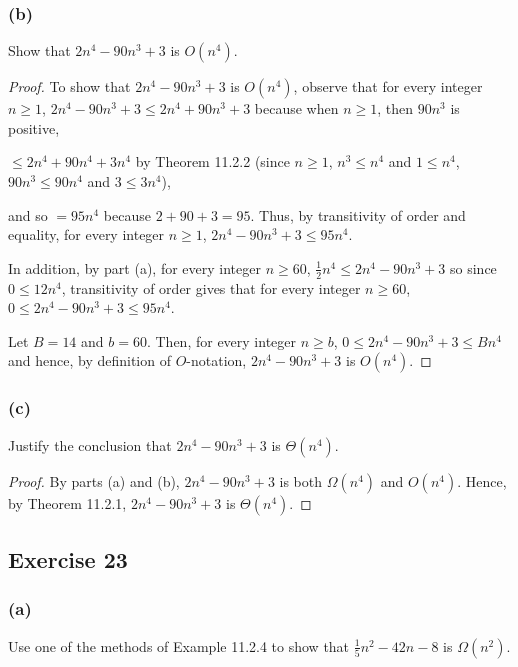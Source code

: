 \documentclass[14pt]{extarticle}
\begin{document}
\subsubsection{(b)}
Show that \(2n^4 - 90n^3 + 3\) is \(O(n^4)\).
\begin{proof}
    To show that \(2n^4 - 90n^3 + 3\) is \(O(n^4)\), observe that for every integer \(n \geq 1\),
    \(2n^4 - 90n^3 + 3 \leq 2n^4 + 90n^3 + 3\) because when \(n \geq 1\), then \(90n^3\) is positive,

    \(\leq 2n^4 + 90n^4 + 3n^4\) by Theorem 11.2.2 (since \(n \geq 1\), \(n^3 \leq n^4\) and \(1 \leq n^4\), \(90n^3 \leq 90n^4\)
    and \(3 \leq 3n^4\)),

    and so \(= 95n^4\) because \(2 + 90 + 3 = 95\). Thus, by transitivity of order and equality, for every integer
    \(n \geq 1\), \(2n^4 - 90n^3 + 3 \leq 95n^4\).

    In addition, by part (a), for every integer \(n \geq 60\), \(\frac{1}{2}n^4 \leq 2n^4 - 90n^3 + 3\) so since
    \(0 \leq 12 n^4\), transitivity of order gives that for every integer \(n \geq 60\), \(0 \leq 2n^4 - 90n^3 + 3 \leq 95n^4\).

    Let \(B = 14\) and \(b = 60\). Then, for every integer \(n \geq b\), \(0 \leq 2n^4 - 90n^3 + 3 \leq Bn^4\) and hence, by
    definition of \(O\)-notation, \(2n^4 - 90n^3 + 3\) is \(O(n^4)\).
\end{proof}

\subsubsection{(c)}
Justify the conclusion that \(2n^4 - 90n^3 + 3\) is \(\Theta(n^4)\).

\begin{proof}
    By parts (a) and (b), \(2n^4 - 90n^3 + 3\) is both \(\Omega(n^4)\) and \(O(n^4)\). Hence, by Theorem 11.2.1,
    \(2n^4 - 90n^3 + 3\) is \(\Theta(n^4)\).
\end{proof}

\subsection{Exercise 23}
\subsubsection{(a)}
Use one of the methods of Example 11.2.4 to show that \(\frac{1}{5}n^2 - 42n - 8\) is \(\Omega(n^2)\).
\end{document}
